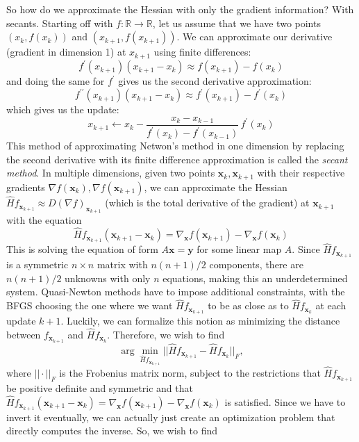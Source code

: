   So how do we approximate the Hessian with only the gradient information? With secants. Starting off with $f: \mathbb{R} \longrightarrow \mathbb{R}$, let us assume that we have two points $(x_k, f(x_k))$ and $(x_{k+1}, f(x_{k+1}))$. We can approximate our derivative (gradient in dimension 1) at $x_{k+1}$ using finite differences: 
  \[f^\prime (x_{k+1}) (x_{k+1} - x_k) \approx f(x_{k+1}) - f(x_k)\]
  and doing the same for $f^\prime$ gives us the second derivative approximation: 
  \[f^{\prime\prime} (x_{k+1}) (x_{k+1} - x_k) \approx f^\prime (x_{k+1}) - f^\prime (x_k)\]
  which gives us the update: 
  \[x_{k+1} \gets x_k - \frac{x_{k} - x_{k-1}}{f^\prime (x_k) - f^\prime (x_{k-1})} \, f^\prime (x_k)\]
  This method of approximating Netwon's method in one dimension by replacing the second derivative with its finite difference approximation is called the \textit{secant method}. In multiple dimensions, given two points $\mathbf{x}_k, \mathbf{x}_{k+1}$ with their respective gradients $\nabla f (\mathbf{x}_{k}), \nabla f (\mathbf{x}_{k+1})$, we can approximate the Hessian $\hat{H} f_{\mathbf{x}_{k+1}} \approx D (\nabla f)_{\mathbf{x}_{k+1}}$ (which is the total derivative of the gradient) at $\mathbf{x}_{k+1}$ with the equation
  \[\hat{H} f_{\mathbf{x}_{k+1}} (\mathbf{x}_{k+1} - \mathbf{x}_k) = \nabla_\mathbf{x} f (\mathbf{x}_{k+1}) - \nabla_\mathbf{x} f (\mathbf{x}_k)\]
  This is solving the equation of form $A \mathbf{x} = \mathbf{y}$ for some linear map $A$. Since $\hat{H} f_{\mathbf{x}_{k+1}}$ is a symmetric $n \times n$ matrix with $n (n+1) / 2$ components, there are $n (n+1) / 2$ unknowns with only $n$ equations, making this an underdetermined system. Quasi-Newton methods have to impose additional constraints, with the BFGS choosing the one where we want $\hat{H} f_{\mathbf{x}_{k+1}}$ to be as close as to $\hat{H} f_{\mathbf{x}_{k}}$ at each update $k+1$. Luckily, we can formalize this notion as minimizing the distance between $f_{\mathbf{x}_{k+1}}$ and $\hat{H} f_{\mathbf{x}_{k}}$. Therefore, we wish to find 
  \[\arg \min_{\hat{H} f_{\mathbf{x}_{k+1}}} ||\hat{H} f_{\mathbf{x}_{k+1}} - \hat{H} f_{\mathbf{x}_{k}}||_F,\]
  where $|| \cdot ||_F$ is the Frobenius matrix norm, subject to the restrictions that $\hat{H} f_{\mathbf{x}_{k+1}}$ be positive definite and symmetric and that $\hat{H} f_{\mathbf{x}_{k+1}} (\mathbf{x}_{k+1} - \mathbf{x}_k) = \nabla_\mathbf{x} f (\mathbf{x}_{k+1}) - \nabla_\mathbf{x} f (\mathbf{x}_k)$ is satisfied. Since we have to invert it eventually, we can actually just create an optimization problem that directly computes the inverse. So, we wish to find 
